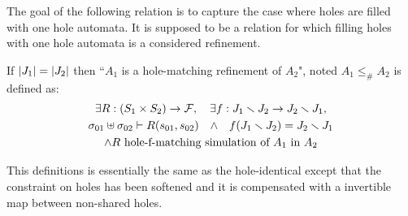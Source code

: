 \documentclass{article}
\begin{document}
The goal of the following relation is to capture the case where holes are filled with one hole automata.
It is supposed to be a relation for which filling holes with one hole automata is a considered refinement.
\begin{defi}
If \({\left|J_1\right|} = {\left|J_2\right|}\) then ``\(A_1\) is a hole-matching refinement of \(A_2\)", noted \(A_1 \leq_\# A_2\) is defined as:
\begin{multline*}
	\exists R: \mpar{S_1 \times S_2} \to \formulae, \quad \exists f: J_1 \setminus J_2 \to J_2 \setminus J_1, \\
	\sigma_{01} \uplus \sigma_{02} \vdash R\mpar{s_{01}, s_{02}} \qwedge f\mpar{J_1 \setminus J_2} = J_2 \setminus J_1 \\
	\wedge R \text{ hole-f-matching simulation of } A_1 \text{ in } A_2
\end{multline*}
\end{defi}
This definitions is essentially the same as the hole-identical except that the constraint on holes has been softened and it is compensated with a invertible map between non-shared holes.
\end{document}
